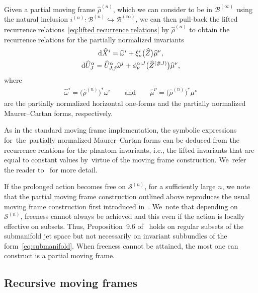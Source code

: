 \documentclass[pdftex]{sigma}%
\numberwithin{equation}{section}
\newcommand{\B}{\mathcal{B}}
\newcommand{\n}{^{(n)}}
\newcommand{\mS}{\mathcal{S}}
\begin{document}
Given a partial moving frame $\widehat{\rho}\n$, which we can consider to be in $\B^{(\infty)}$ using the natural inclusion $i\n\colon \B\n \hookrightarrow \B^{(\infty)}$, we can then pull-back the lifted recurrence relations~\eqref{eq:lifted recurrence relations} by $\widehat{\rho}\n$ to obtain the recurrence relations for the partially normalized invariants
%
\begin{gather*}
{\rm d}\widehat{X}^i = \widehat{\omega}^i + \xi^i_\nu\big(\widehat{Z}\big) \widehat{\mu}^\nu,
\\
{\rm d}\widehat{U}^\alpha_{J} = \widehat{U}_{J,j}^\alpha \widehat{\omega}^j + \phi^{\alpha;J}_\nu\big(\widehat{Z}^{(\#J)}\big) \widehat{\mu}^\nu,
\end{gather*}
%
where
%
\begin{gather*}
\widehat{\omega}^i = \big(\widehat{\rho}\n\big)^*\omega^i\qquad\text{and}\qquad
\widehat{\mu}^\nu = \big(\widehat{\rho}\n\big)^*\mu^\nu
\end{gather*}
are the partially normalized horizontal one-forms and the partially normalized Maurer--Cartan forms, respectively.

\begin{Remark}
As in the standard moving frame implementation, the symbolic expressions for~the~par\-tially normalized Maurer--Cartan forms can be deduced from the recurrence relations for the phantom invariants, i.e., the lifted invariants that are equal to constant values by~vir\-tue of the moving frame construction. We~refer the reader to~\cite{FO-1999} for more detail.
\end{Remark}

\begin{Remark}
If the prolonged action becomes free on $\mS\n$, for a sufficiently large $n$, we note that the partial moving frame construction outlined above reproduces the usual moving frame construction first introduced in~\cite{FO-1999}. We~note that depending on~$\mS\n$, freeness cannot always be achieved and this even if the action is locally effective on subsets. Thus, Proposition~9.6 of~\cite{FO-1999} holds on regular subsets of the submanifold jet space but not necessarily on invariant subbundles of the form~\eqref{eq:submanifold}. When freeness cannot be attained, the most one can construct is a partial moving frame.
\end{Remark}

\subsection{Recursive moving frames}
\end{document}
